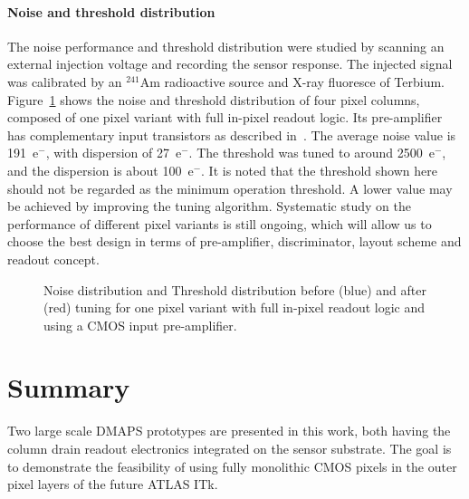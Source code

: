 \documentclass[a4paper,11pt]{article}
\begin{document}
\paragraph{Noise and threshold distribution}
The noise performance and threshold distribution were studied by scanning an external injection voltage and recording the sensor response. The injected signal was calibrated by an $^{241}$Am radioactive source and X-ray fluoresce of Terbium. Figure~\ref{fig:Noise_Th} shows the noise and threshold distribution of four pixel columns, composed of one pixel variant with full in-pixel readout logic. Its pre-amplifier has complementary input transistors as described in~\cite{LFCPIX_Yavuz_2017}. The average noise value is 191~e$^{-}$, with dispersion of 27~e$^{-}$. The threshold was tuned to around 2500~e$^{-}$, and the dispersion is about 100~e$^{-}$. It is noted that the threshold shown here should not be regarded as the minimum operation threshold. A lower value may be achieved by improving the tuning algorithm. Systematic study on the performance of different pixel variants is still ongoing, which will allow us to choose the best design in terms of pre-amplifier, discriminator, layout scheme and readout concept. 

\begin{figure}[!ht]
  \begin{center}
    \caption[]{ Noise distribution and  Threshold distribution before (blue) and after (red) tuning for one pixel variant with full in-pixel readout logic and using a CMOS input pre-amplifier.} 
    \label{fig:Noise_Th}
  \end{center}
\end{figure}


\section{Summary}
\label{sec:Summary}

Two large scale DMAPS prototypes are presented in this work, both having the column drain readout electronics integrated on the sensor substrate. The goal is to demonstrate the feasibility of using fully monolithic CMOS pixels in the outer pixel layers of the future ATLAS ITk.
\end{document}
